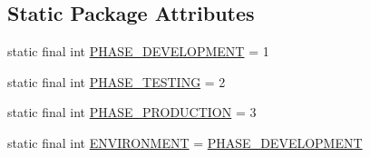 \subsection*{\-Static \-Package \-Attributes}
\begin{DoxyCompactItemize}
\item 
static final int \hyperlink{classcom_1_1axcoto_1_1shinjuku_1_1sushi_1_1_main_activity_aade1c8f5801b0300f9e518514270fba5}{\-P\-H\-A\-S\-E\-\_\-\-D\-E\-V\-E\-L\-O\-P\-M\-E\-N\-T} = 1
\item 
static final int \hyperlink{classcom_1_1axcoto_1_1shinjuku_1_1sushi_1_1_main_activity_a2a670f251ae2c3adf2c9ce19f638d5ee}{\-P\-H\-A\-S\-E\-\_\-\-T\-E\-S\-T\-I\-N\-G} = 2
\item 
static final int \hyperlink{classcom_1_1axcoto_1_1shinjuku_1_1sushi_1_1_main_activity_a8c1eb7ffb853936d09ef4278377c843f}{\-P\-H\-A\-S\-E\-\_\-\-P\-R\-O\-D\-U\-C\-T\-I\-O\-N} = 3
\item 
static final int \hyperlink{classcom_1_1axcoto_1_1shinjuku_1_1sushi_1_1_main_activity_a552bead3ea0c6d8776fb5fa7dd4fd1dd}{\-E\-N\-V\-I\-R\-O\-N\-M\-E\-N\-T} = \hyperlink{classcom_1_1axcoto_1_1shinjuku_1_1sushi_1_1_main_activity_aade1c8f5801b0300f9e518514270fba5}{\-P\-H\-A\-S\-E\-\_\-\-D\-E\-V\-E\-L\-O\-P\-M\-E\-N\-T}
\end{DoxyCompactItemize}


